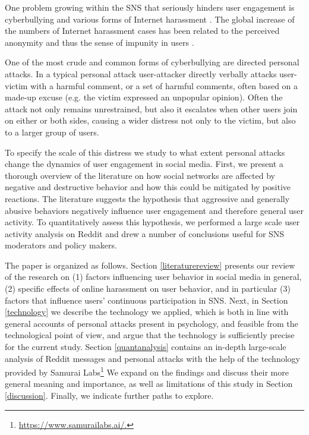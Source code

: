 \documentclass[a4paper,fleqn]{cas-dc}
\begin{document}
One problem growing within the SNS that  seriously hinders user engagement is  cyberbullying and various forms of Internet harassment \citep{ptaszynski2018automatic}. The global increase of the numbers of Internet harassment cases has been related to the perceived anonymity and thus the sense of impunity in users 
\citep{barlett2015anonymously,barlett2016predicting}. 

One of the most crude and common forms of cyberbullying are directed personal attacks. In a typical personal attack user-attacker directly verbally attacks user-victim with a harmful comment, or a set of harmful comments, often based on a made-up excuse (e.g. the victim expressed an unpopular opinion). Often the attack not only remains unrestrained, but also it escalates when other users join on either or both sides, causing a wider distress not only to the victim, but also to a larger group of users. 





To specify the scale of this distress we study to what extent personal attacks change the dynamics of user engagement in social media. 
First, we present a thorough overview of the literature  on how social networks are affected by negative and destructive behavior and how this could be mitigated by positive reactions. The literature suggests the hypothesis that aggressive and generally abusive behaviors negatively influence user engagement and therefore general user activity. To quantitatively assess this hypothesis, we performed a large scale user activity analysis on Reddit and drew a number of conclusions useful for SNS moderators and policy makers.


The paper is organized as follows.
Section \ref{literaturereview} presents our review of the research on (1)  factors influencing user behavior in social media in general, (2) specific effects of online harassment on user behavior, and in particular (3) factors that influence users' continuous participation in SNS. 
Next, in Section \ref{technology} we describe the technology we applied, which is both in line with general accounts of personal attacks present in psychology, and feasible from the technological point of view, and argue that the technology is sufficiently precise for the current study. Section \ref{quantanalysis} contains an in-depth large-scale analysis of Reddit messages and personal attacks  with the help of the technology provided by \textsf{Samurai Labs}\footnote{\url{https://www.samurailabs.ai/.}} We expand on the findings and discuss their more general meaning and importance, as well as limitations of this study in Section \ref{discussion}. Finally,  we  indicate  further paths to explore.
\end{document}
